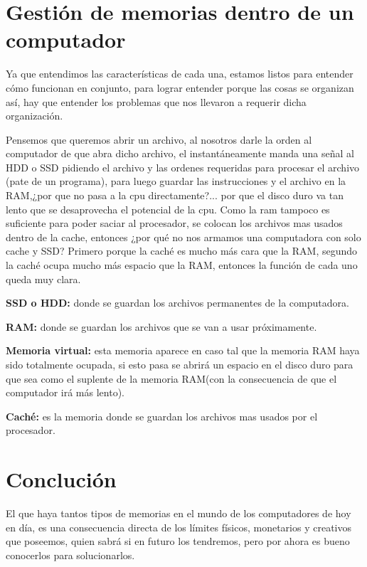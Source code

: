 \documentclass{article}
\begin{document}
\section{Gestión de memorias dentro de un computador}
\vspace{1cm}

Ya que entendimos las características de cada una, estamos listos para entender cómo funcionan en conjunto, para lograr entender porque las cosas se organizan así, hay que entender los problemas que nos llevaron a requerir dicha organización.
\vspace{0.4cm}

Pensemos que queremos abrir un archivo, al nosotros darle la orden al computador de que abra dicho archivo, el instantáneamente manda una señal al HDD o SSD pidiendo el archivo y las ordenes requeridas para procesar el archivo (pate de un programa), para luego guardar las instrucciones y el archivo en la RAM,¿por que no pasa a la cpu directamente?... por que el disco duro va tan lento que se desaprovecha el potencial de la cpu. Como la ram tampoco es suficiente para poder saciar al procesador, se colocan los archivos mas usados dentro de la cache, entonces ¿por qué no nos armamos una computadora con solo cache y SSD? Primero porque la caché es mucho más cara que la RAM, segundo la caché ocupa mucho más espacio que la RAM, entonces la función de cada uno queda muy clara.\cite{pdfu}
\vspace{0.4cm}

\textbf{SSD o HDD:} donde se guardan los archivos permanentes de la 
computadora.
\vspace{0.4cm}

\textbf{RAM:} donde se guardan los archivos que se van a usar próximamente.
\vspace{0.4cm}

\textbf{Memoria virtual:} esta memoria aparece en caso tal que la memoria RAM haya sido totalmente ocupada, si esto pasa se abrirá un espacio en el disco duro para que sea como el suplente de la memoria RAM(con la consecuencia de que el computador irá más lento).
\vspace{0.4cm}

\textbf{Caché:} es la memoria donde se guardan los archivos mas usados por el procesador. 
\vspace{3cm}
\newpage
\section{Conclución}
\vspace{1cm}
El que haya tantos tipos de memorias en el mundo de los computadores de hoy en día, es una consecuencia directa de los límites físicos, monetarios y creativos que poseemos, quien sabrá si en futuro los tendremos, pero por ahora es bueno conocerlos para solucionarlos.
\vspace{3cm}





\end{document}
